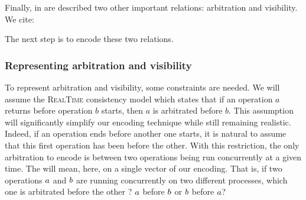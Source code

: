 \documentclass[12pt]{article}
\begin{document}
\vspace{1em}

Finally, in  are described two other important relations: arbitration and visibility. We cite:
\vspace{1em}

 
\vspace{1em}


 
\vspace{1em}

The next step is to encode these two relations.

\vspace{1em}
\subsubsection{Representing arbitration and visibility}
\vspace{1em}

To represent arbitration and visibility, some constraints are needed. We will assume the \textsc{RealTime} \citep{PrinciplesOfEventualConsistency} consistency model which states that if an operation $a$ returns before operation $b$ starts, then $a$ is arbitrated before $b$. This assumption will significantly simplify our encoding technique while still remaining realistic. Indeed, if an operation ends before another one starts, it is natural to assume that this first operation has been  before the other. With this restriction, the only arbitration to encode is between two operations being run concurrently at a given time. The  will mean, here, on a single vector of our encoding. That is, if two operations $a$ and $b$ are running concurrently on two different processes, which one is arbitrated before the other ? $a$ before $b$ or $b$ before $a$?
\end{document}
